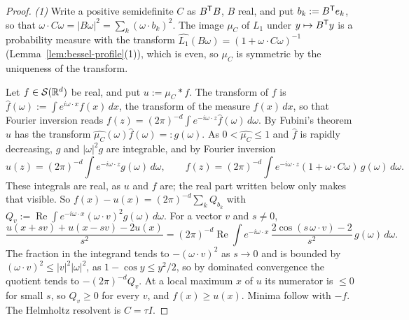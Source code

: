 \begin{proof}
\emph{(1)} Write a positive semidefinite $C$ as $B^{\mathsf{T}}B$, $B$ real, and put
$b_k := B^{\mathsf{T}}e_k$, so that $\omega\cdot C\omega = |B\omega|^2 = \sum_k(\omega\cdot b_k)^2$. The
image $\mu_C$ of $L_1$ under $y \mapsto B^{\mathsf{T}}y$ is a probability measure with the transform
$\widehat{L_1}(B\omega) = (1 + \omega\cdot C\omega)^{-1}$ (Lemma~\ref{lem:bessel-profile}(1)), which
is even, so $\mu_C$ is symmetric by the uniqueness of the transform.

Let $f \in \mathcal{S}(\mathbb{R}^d)$ be real, and put $u := \mu_C * f$. The transform of $f$ is
$\widehat f(\omega) := \int e^{i\omega\cdot x}f(x)\,dx$, the transform of the measure $f(x)\,dx$, so
that Fourier inversion reads
$f(z) = (2\pi)^{-d}\int e^{-i\omega\cdot z}\widehat f(\omega)\,d\omega$. By Fubini's theorem $u$ has
the transform $\widehat{\mu_C}(\omega)\widehat f(\omega) =: g(\omega)$. As
$0 < \widehat{\mu_C} \le 1$ and $\widehat f$ is rapidly
decreasing, $g$ and $|\omega|^2g$ are integrable, and by Fourier inversion
\[
  u(z) = (2\pi)^{-d}\int e^{-i\omega\cdot z}g(\omega)\,d\omega, \qquad
  f(z) = (2\pi)^{-d}\int e^{-i\omega\cdot z}(1 + \omega\cdot C\omega)\,g(\omega)\,
  d\omega .
\]
These integrals are real, as $u$ and $f$ are; the real part written below only makes that
visible. So $f(x) - u(x) = (2\pi)^{-d}\sum_kQ_{b_k}$ with $Q_v := \operatorname{Re}\int e^{-i\omega\cdot x}
(\omega\cdot v)^2g(\omega)\,d\omega$. For a vector $v$ and $s \ne 0$,
\[
  \frac{u(x + sv) + u(x - sv) - 2u(x)}{s^2} = (2\pi)^{-d}\operatorname{Re}\int e^{-i\omega\cdot x}\,
  \frac{2\cos(s\,\omega\cdot v) - 2}{s^2}\,g(\omega)\,d\omega .
\]
The fraction in the integrand tends to $-(\omega\cdot v)^2$ as $s \to 0$ and is bounded by
$(\omega\cdot v)^2 \le |v|^2|\omega|^2$, as $1 - \cos y \le y^2/2$, so by dominated convergence the
quotient tends to $-(2\pi)^{-d}Q_v$. At a local maximum $x$ of $u$ its numerator is $\le 0$ for
small $s$, so $Q_v \ge 0$ for every $v$, and $f(x) \ge u(x)$. Minima follow with $-f$. The
Helmholtz resolvent is $C = \tau I$.


\end{proof}
